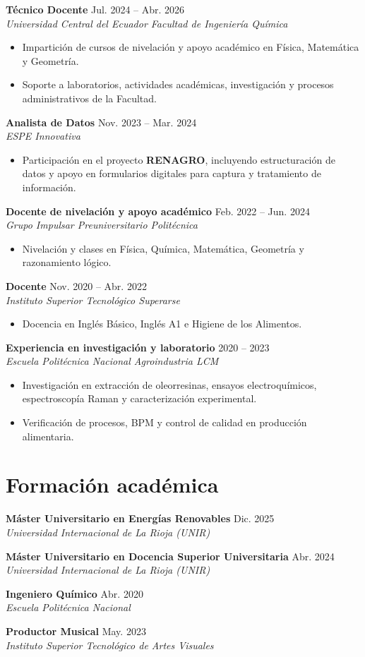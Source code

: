 \documentclass[10pt,a4paper]{article}
\newcommand{\cventry}[4]{%
  \Needspace{3\baselineskip}%
  {\bfseries #1} \hfill {\small\color{cvgray} #2}\\
  {\itshape #3}\\[-0.25em]
  #4\par\vspace{0.25em}
}
\begin{document}
\cventry{Técnico Docente}{Jul. 2024 -- Abr. 2026}{Universidad Central del Ecuador \textbar{} Facultad de Ingeniería Química}{%
\begin{itemize}
  \item Impartición de cursos de nivelación y apoyo académico en Física, Matemática y Geometría.
  \item Soporte a laboratorios, actividades académicas, investigación y procesos administrativos de la Facultad.
\end{itemize}}

\cventry{Analista de Datos}{Nov. 2023 -- Mar. 2024}{ESPE Innovativa}{%
\begin{itemize}
  \item Participación en el proyecto \textbf{RENAGRO}, incluyendo estructuración de datos y apoyo en formularios digitales para captura y tratamiento de información.
\end{itemize}}

\cventry{Docente de nivelación y apoyo académico}{Feb. 2022 -- Jun. 2024}{Grupo Impulsar \textbar{} Preuniversitario Politécnica}{%
\begin{itemize}
  \item Nivelación y clases en Física, Química, Matemática, Geometría y razonamiento lógico.
\end{itemize}}

\cventry{Docente}{Nov. 2020 -- Abr. 2022}{Instituto Superior Tecnológico Superarse}{%
\begin{itemize}
  \item Docencia en Inglés Básico, Inglés A1 e Higiene de los Alimentos.
\end{itemize}}

\cventry{Experiencia en investigación y laboratorio}{2020 -- 2023}{Escuela Politécnica Nacional \textbar{} Agroindustria LCM}{%
\begin{itemize}
  \item Investigación en extracción de oleorresinas, ensayos electroquímicos, espectroscopía Raman y caracterización experimental.
  \item Verificación de procesos, BPM y control de calidad en producción alimentaria.
\end{itemize}}

\newpage

\section*{Formación académica}
\cventry{Máster Universitario en Energías Renovables}{Dic. 2025}{Universidad Internacional de La Rioja (UNIR)}{}
\cventry{Máster Universitario en Docencia Superior Universitaria}{Abr. 2024}{Universidad Internacional de La Rioja (UNIR)}{}
\cventry{Ingeniero Químico}{Abr. 2020}{Escuela Politécnica Nacional}{}
\cventry{Productor Musical}{May. 2023}{Instituto Superior Tecnológico de Artes Visuales}{}
\end{document}
